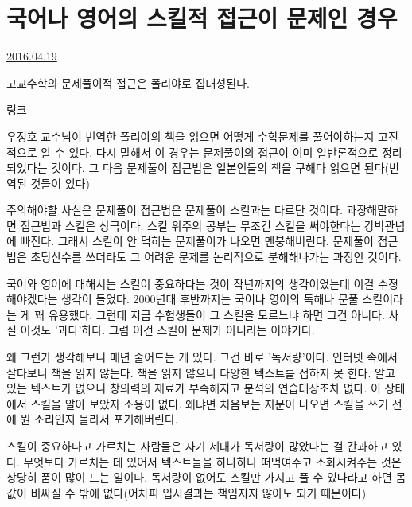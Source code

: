 \section{국어나 영어의 스킬적 접근이 문제인 경우}
\href{https://www.kockoc.com/Apoc/735647}{2016.04.19}

\vspace{5mm}

고교수학의 문제풀이적 접근은 폴리야로 집대성된다.
\vspace{5mm}

\href{https://en.wikipedia.org/wiki/George_P%C3%B3lya}{링크}
\vspace{5mm}

우정호 교수님이 번역한 폴리야의 책을 읽으면 어떻게 수학문제를 풀어야하는지 고전적으로 알 수 있다.
다시 말해서 이 경우는 문제풀이의 접근이 이미 일반론적으로 정리되었다는 것이다.
그 다음 문제풀이 접근법은 일본인들의 책을 구해다 읽으면 된다(번역된 것들이 있다)
\vspace{5mm}

주의해야할 사실은 문제풀이 접근법은 문제풀이 스킬과는 다르단 것이다. 과장해말하면 접근법과 스킬은 상극이다.
스킬 위주의 공부는 무조건 스킬을 써야한다는 강박관념에 빠진다. 그래서 스킬이 안 먹히는 문제풀이가 나오면 멘붕해버린다.
문제풀이 접근법은 초딩산수를 쓰더라도 그 어려운 문제를 논리적으로 분해해나가는 과정인 것이다.
\vspace{5mm}

국어와 영어에 대해서는 스킬이 중요하다는 것이 작년까지의 생각이었는데 이걸 수정해야겠다는 생각이 들었다.
2000년대 후반까지는 국어나 영어의 독해나 문풀 스킬이라는 게 꽤 유용했다.
그런데 지금 수험생들이 그 스킬을 모르느냐 하면 그건 아니다. 사실 이것도 '과다'하다.
그럼 이건 스킬이 문제가 아니라는 이야기다.
\vspace{5mm}

왜 그런가 생각해보니 매년 줄어드는 게 있다. 그건 바로 '독서량'이다.
인터넷 속에서 살다보니 책을 읽지 않는다. 책을 읽지 않으니 다양한 텍스트를 접하지 못 한다.
알고 있는 텍스트가 없으니 창의력의 재료가 부족해지고 분석의 연습대상조차 없다.
이 상태에서 스킬을 알아 보았자 소용이 없다. 왜냐면 처음보는 지문이 나오면 스킬을 쓰기 전에 뭔 소리인지 몰라서 포기해버린다.
\vspace{5mm}

스킬이 중요하다고 가르치는 사람들은 자기 세대가 독서량이 많았다는 걸 간과하고 있다.
무엇보다 가르치는 데 있어서 텍스트들을 하나하나 떠먹여주고 소화시켜주는 것은 상당히 품이 많이 드는 일이다.
독서량이 없어도 스킬만 가지고 풀 수 있다라고 하면 몸값이 비싸질 수 밖에 없다(어차피 입시결과는 책임지지 않아도 되기 때문이다)
\vspace{5mm}

